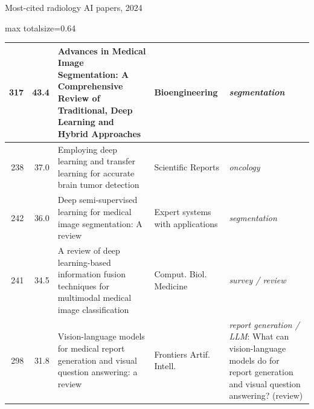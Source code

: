 \documentclass[aspectratio=169]{beamer}
\begin{document}
\begin{frame}[category=Journals/Preprints]{Most-cited radiology AI papers, 2024}
\begin{adjustbox}{max totalsize={\textwidth}{0.64\textheight}}
\begin{tabular}{|r|r|>{\raggedright\arraybackslash}p{}|>{\raggedright\arraybackslash}p{}|>{\raggedright\arraybackslash}p{}|}
317 & 43.4 & Advances in Medical Image Segmentation: A Comprehensive Review of Traditional, Deep Learning and Hybrid Approaches & Bioengineering & \textit{segmentation} \\ \hline
238 & 37.0 & Employing deep learning and transfer learning for accurate brain tumor detection & Scientific Reports & \textit{oncology} \\ \hline
242 & 36.0 & Deep semi-supervised learning for medical image segmentation: A review & Expert systems with applications & \textit{segmentation} \\ \hline
241 & 34.5 & A review of deep learning-based information fusion techniques for multimodal medical image classification & Comput. Biol. Medicine & \textit{survey / review} \\ \hline
298 & 31.8 & Vision-language models for medical report generation and visual question answering: a review & Frontiers Artif. Intell. & \textit{report generation / LLM}: What can vision-language models do for report generation and visual question answering? (review) \\ \hline
\end{tabular}
\end{adjustbox}
\\[1pt]
{\tiny }
\end{frame}
\end{document}
